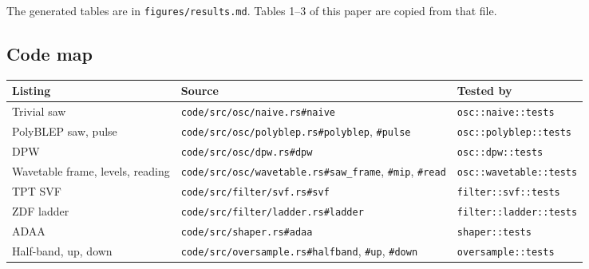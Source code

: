 \documentclass[conference]{IEEEtran}
\begin{document}
The generated tables are in \texttt{figures/\allowbreak{}results.\allowbreak{}md}. Tables 1–3 of this paper are copied from that file.

\setcounter{subsection}{5}
\subsection{Code map}
\begin{table}[t]
\centering\footnotesize
\begin{tabularx}{\textwidth}{@{}>{\raggedright\arraybackslash}X>{\raggedright\arraybackslash}X>{\raggedright\arraybackslash}X@{}}
\toprule
\textbf{Listing} & \textbf{Source} & \textbf{Tested by} \\
\midrule
Trivial saw & \texttt{code/\allowbreak{}src/\allowbreak{}osc/\allowbreak{}naive.\allowbreak{}rs\#\allowbreak{}naive} & \texttt{osc::\allowbreak{}naive::\allowbreak{}tests} \\
PolyBLEP saw, pulse & \texttt{code/\allowbreak{}src/\allowbreak{}osc/\allowbreak{}polyblep.\allowbreak{}rs\#\allowbreak{}polyblep}, \texttt{\#\allowbreak{}pulse} & \texttt{osc::\allowbreak{}polyblep::\allowbreak{}tests} \\
DPW & \texttt{code/\allowbreak{}src/\allowbreak{}osc/\allowbreak{}dpw.\allowbreak{}rs\#\allowbreak{}dpw} & \texttt{osc::\allowbreak{}dpw::\allowbreak{}tests} \\
Wavetable frame, levels, reading & \texttt{code/\allowbreak{}src/\allowbreak{}osc/\allowbreak{}wavetable.\allowbreak{}rs\#\allowbreak{}saw\_\allowbreak{}frame}, \texttt{\#\allowbreak{}mip}, \texttt{\#\allowbreak{}read} & \texttt{osc::\allowbreak{}wavetable::\allowbreak{}tests} \\
TPT SVF & \texttt{code/\allowbreak{}src/\allowbreak{}filter/\allowbreak{}svf.\allowbreak{}rs\#\allowbreak{}svf} & \texttt{filter::\allowbreak{}svf::\allowbreak{}tests} \\
ZDF ladder & \texttt{code/\allowbreak{}src/\allowbreak{}filter/\allowbreak{}ladder.\allowbreak{}rs\#\allowbreak{}ladder} & \texttt{filter::\allowbreak{}ladder::\allowbreak{}tests} \\
ADAA & \texttt{code/\allowbreak{}src/\allowbreak{}shaper.\allowbreak{}rs\#\allowbreak{}adaa} & \texttt{shaper::\allowbreak{}tests} \\
Half-band, up, down & \texttt{code/\allowbreak{}src/\allowbreak{}oversample.\allowbreak{}rs\#\allowbreak{}halfband}, \texttt{\#\allowbreak{}up}, \texttt{\#\allowbreak{}down} & \texttt{oversample::\allowbreak{}tests} \\

\end{tabularx}
\end{table}
\end{document}
